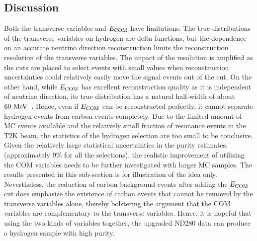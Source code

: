      \subsection{Discussion}
     Both the transverse variables and $E_{\textrm{COM}}$ have limitations.
     The true distributions of the transverse variables on hydrogen are delta functions, but the dependence on an accurate neutrino direction reconstruction limits the reconstruction resolution of the transverse variables.
     The impact of the resolution is amplified as the cuts are placed to select events with small values when reconstruction uncertainties could relatively easily move the signal events out of the cut.
     On the other hand, while $E_{\textrm{COM}}$ has excellent reconstruction quality as it is independent of neutrino direction, its true distribution has a natural half-width of about $60~\textrm{MeV}$~\cite{ParticleDataGroup:2024cfk}.
     Hence, even if $E_{\textrm{COM}}$ can be reconstructed perfectly, it cannot separate hydrogen events from carbon events completely.
     Due to the limited amount of MC events available and the relatively small fraction of resonance events in the T2K beam, the statistics of the hydrogen selection are too small to be conclusive.
     Given the relatively large statistical uncertainties in the purity estimates, (approximately $9\%$ for all the selections), the realistic improvement of utilizing the COM variables needs to be further investigated with larger MC samples.
     The results presented in this sub-section is for illustration of the idea only.
     Nevertheless, the reduction of carbon background events after adding the $E_{\textrm{COM}}$ cut does emphasize the existence of carbon events that cannot be removed by the transverse variables alone, thereby bolstering the argument that the COM variables are complementary to the transverse variables.
     Hence, it is hopeful that using the two kinds of variables together, the upgraded ND280 data can produce a hydrogen sample with high purity.